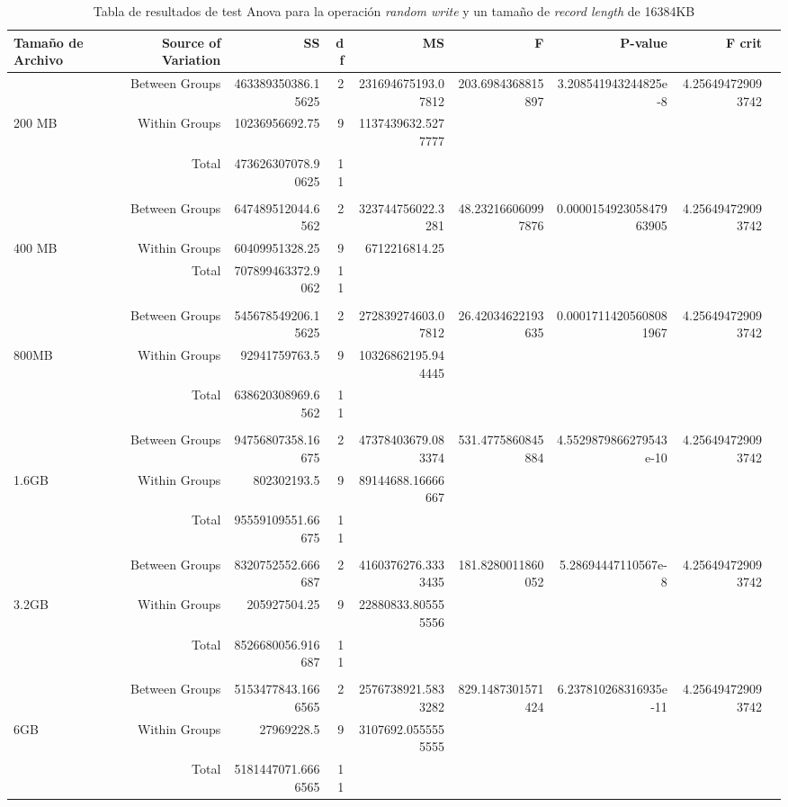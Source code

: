 \begin{landscape}
\begin{table}[!htp]\centering
\caption{Tabla de resultados de test Anova para la operación \textit{random write} y un tamaño de \textit{record length} de 16384KB}\label{tab: }
\scriptsize
\begin{tabular}{lrrrrrrrr}\toprule
Tamaño de Archivo &Source of Variation &SS &df &MS &F &P-value &F crit \\\midrule
&Between Groups &463389350386.15625 &2 &231694675193.07812 &203.6984368815897 &3.208541943244825e-8 &4.256494729093742 \\
200 MB &Within Groups &10236956692.75 &9 &1137439632.5277777 & & & \\
&Total &473626307078.90625 &11 & & & & \\
& & & & & & & \\
&Between Groups &647489512044.6562 &2 &323744756022.3281 &48.232166060997876 &0.000015492305847963905 &4.256494729093742 \\
400 MB &Within Groups &60409951328.25 &9 &6712216814.25 & & & \\
&Total &707899463372.9062 &11 & & & & \\
& & & & & & & \\
&Between Groups &545678549206.15625 &2 &272839274603.07812 &26.42034622193635 &0.00017114205608081967 &4.256494729093742 \\
800MB &Within Groups &92941759763.5 &9 &10326862195.944445 & & & \\
&Total &638620308969.6562 &11 & & & & \\
& & & & & & & \\
&Between Groups &94756807358.16675 &2 &47378403679.083374 &531.4775860845884 &4.5529879866279543e-10 &4.256494729093742 \\
1.6GB &Within Groups &802302193.5 &9 &89144688.16666667 & & & \\
&Total &95559109551.66675 &11 & & & & \\
& & & & & & & \\
&Between Groups &8320752552.666687 &2 &4160376276.3333435 &181.8280011860052 &5.28694447110567e-8 &4.256494729093742 \\
3.2GB &Within Groups &205927504.25 &9 &22880833.805555556 & & & \\
&Total &8526680056.916687 &11 & & & & \\
& & & & & & & \\
&Between Groups &5153477843.1666565 &2 &2576738921.5833282 &829.1487301571424 &6.237810268316935e-11 &4.256494729093742 \\
6GB &Within Groups &27969228.5 &9 &3107692.0555555555 & & & \\
&Total &5181447071.6666565 &11 & & & & \\
\bottomrule
\end{tabular}
\end{table}
\end{landscape}

